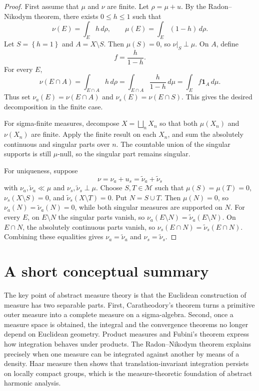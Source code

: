 \documentclass[11pt,openany]{book}
\numberwithin{equation}{chapter}
\theoremstyle{definition}
\theoremstyle{plain}
\theoremstyle{remark}
\newcommand{\M}{\mathcal{M}}
\newcommand{\1}{\mathbf{1}}
\newcommand{\dd}{\,d}
\newcommand{\set}[1]{\left\{#1\right\}}
\begin{document}
\begin{proof}
First assume that \(\mu\) and \(\nu\) are finite. Let \(\rho=\mu+
u\). By the Radon--Nikodym theorem, there exists \(0\leq h\leq1\) such that
\[
  \nu(E)=\int_Eh\dd\rho,
  \qquad
  \mu(E)=\int_E(1-h)\dd\rho.
\]
Let \(S=\set{h=1}\) and \(A=X\setminus S\). Then \(\mu(S)=0\), so \(\nu|_S\perp\mu\). On \(A\), define
\[
  f=\frac{h}{1-h}.
\]
For every \(E\),
\[
  \nu(E\cap A)=\int_{E\cap A}h\dd\rho
  =\int_{E\cap A}\frac{h}{1-h}\dd\mu
  =\int_E f\1_A\dd\mu.
\]
Thus set \(\nu_a(E)=\nu(E\cap A)\) and \(\nu_s(E)=\nu(E\cap S)\). This gives the desired decomposition in the finite case.

For sigma-finite measures, decompose \(X=\bigsqcup_nX_n\) so that both \(\mu(X_n)
\) and \(\nu(X_n)\) are finite. Apply the finite result on each \(X_n\), and sum the absolutely continuous and singular parts over \(n\). The countable union of the singular supports is still \(\mu\)-null, so the singular part remains singular.

For uniqueness, suppose
\[
  \nu=\nu_a+
u_s=\widetilde\nu_a+
\widetilde\nu_s
\]
with \(\nu_a,
\widetilde\nu_a\ll\mu\) and \(\nu_s,
\widetilde\nu_s\perp\mu\). Choose \(S,T\in\M\) such that \(\mu(S)=\mu(T)=0\), \(\nu_s(X\setminus S)=0\), and \(\widetilde\nu_s(X\setminus T)=0\). Put \(N=S\cup T\). Then \(\mu(N)=0\), so \(\nu_a(N)=\widetilde\nu_a(N)=0\), while both singular measures are supported on \(N\). For every \(E\), on \(E\setminus N\) the singular parts vanish, so \(\nu_a(E\setminus N)=\widetilde\nu_a(E\setminus N)\). On \(E\cap N\), the absolutely continuous parts vanish, so \(\nu_s(E\cap N)=\widetilde\nu_s(E\cap N)\). Combining these equalities gives \(\nu_a=\widetilde\nu_a\) and \(\nu_s=\widetilde\nu_s\).
\end{proof}

\section{A short conceptual summary}

The key point of abstract measure theory is that the Euclidean construction of measure has two separable parts. First, Caratheodory's theorem turns a primitive outer measure into a complete measure on a sigma-algebra. Second, once a measure space is obtained, the integral and the convergence theorems no longer depend on Euclidean geometry. Product measures and Fubini's theorem express how integration behaves under products. The Radon--Nikodym theorem explains precisely when one measure can be integrated against another by means of a density. Haar measure then shows that translation-invariant integration persists on locally compact groups, which is the measure-theoretic foundation of abstract harmonic analysis.
\end{document}
